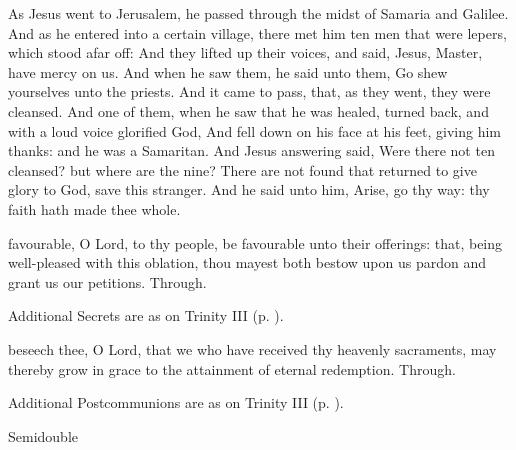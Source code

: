 
 As Jesus went to Jerusalem, he passed through the midst of Samaria and Galilee. And as he entered into a certain village, there met him ten men that were lepers, which stood afar off: And they lifted up their voices, and said, Jesus, Master, have mercy on us. And when he saw them, he said unto them, Go shew yourselves unto the priests. And it came to pass, that, as they went, they were cleansed. And one of them, when he saw that he was healed, turned back, and with a loud voice glorified God, And fell down on his face at his feet, giving him thanks: and he was a Samaritan. And Jesus answering said, Were there not ten cleansed? but where are the nine? There are not found that returned to give glory to God, save this stranger. And he said unto him, Arise, go thy way: thy faith hath made thee whole.


\secret
{} favourable, O Lord, to thy people, be favourable unto their offerings: that, being well-pleased with this oblation, thou mayest both bestow upon us pardon and grant us our petitions. Through.
\begin{rubric}
    Additional Secrets are as on Trinity III (p. \pageref{TrinityIII}).
\end{rubric}


\postcommunion
{} beseech thee, O Lord, that we who have received thy heavenly sacraments, may thereby grow in grace to the attainment of eternal redemption. Through.
\begin{rubric}
    Additional Postcommunions are as on Trinity III (p. \pageref{TrinityIII}).
\end{rubric}

\begin{inhead}
{Semidouble}
\end{inhead}
\par\noindent
{}

